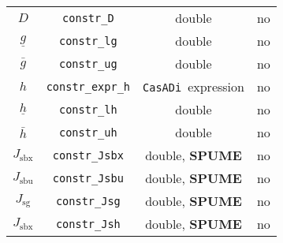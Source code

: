 \documentclass[
a4paper, %
10pt, %
notitlepage,
english]{CSUniSchoolLabReport}
\newcommand{\code}[1]{\texttt{#1}}
\newcommand{\casadi}{\texttt{CasADi}}
\newcommand{\ind}[1]{_{\textrm{#1}}}
\newcommand{\optional}{no}
\begin{document}
\begin{appendices}
\begin{table}[h!]
\begin{tabular}{cccc}
		$D $    & \code{constr\_D}     & double  & \optional \\
		$\underline{g} $    & \code{constr\_lg}     & double  & \optional    \\
		$\bar{g} $         & \code{constr\_ug}     & double  & \optional   \\ [1em]
		$ h $ & \code{constr\_expr\_h}    & \casadi~expression  & \optional   \\
		$\underline{h} $    & \code{constr\_lh}     & double   & \optional   \\
		$\bar{h} $         & \code{constr\_uh}     & double  & \optional   \\ [1em]
		$ J\ind{sbx} $ & \code{constr\_Jsbx} & double, \textbf{SPUME} & \optional  \\
		$ J\ind{sbu} $ & \code{constr\_Jsbu} & double, \textbf{SPUME}  & \optional \\
		$ J\ind{sg} $ & \code{constr\_Jsg} & double, \textbf{SPUME} & \optional  \\
		$ J\ind{sbx} $ & \code{constr\_Jsh} & double, \textbf{SPUME}  & \optional  \\
		\bottomrule
	\end{tabular}
\end{table}
%

\end{appendices}
\end{document}
